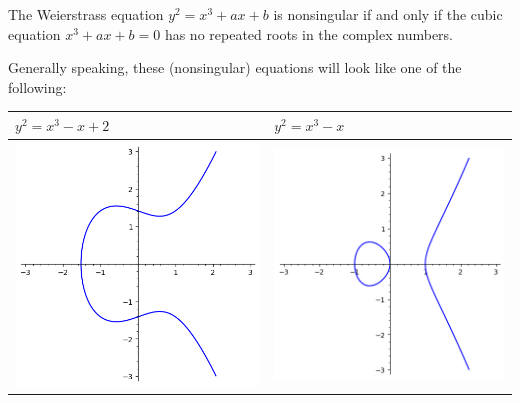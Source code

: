 \documentclass[letterpaper]{article}
\begin{document}
\begin{theorem}{}{}
    The Weierstrass equation $y^2 = x^3 + ax + b$ is nonsingular if and only if the cubic equation $x^3 + ax + b = 0$ has no repeated roots in the complex numbers.
\end{theorem}
Generally speaking, these (nonsingular) equations will look like one of the following:
\begin{center}
    \begin{tabular}{p{3in}|p{3in}}

        $y^2 = x^3 - x + 2$ & $y^2 = x^3 - x$ \\ 
        \hline 
        
        \bigskip 

        \includegraphics[scale=0.63]{assets/weiers_1.png}
        &
        
        \bigskip 
        
        \includegraphics[scale=0.63]{assets/weiers_2.png}
    \end{tabular}
\end{center}
\end{document}
